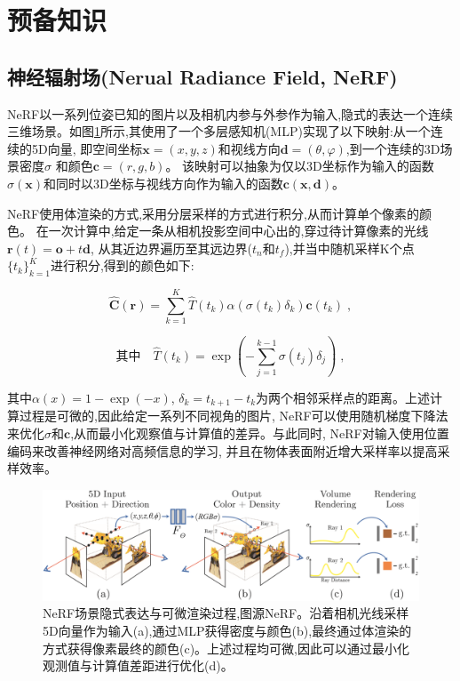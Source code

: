 \section{预备知识}\label{preliminaries}

\subsection{神经辐射场(Nerual\; Radiance\; Field, NeRF)}

NeRF以一系列位姿已知的图片以及相机内参与外参作为输入,隐式的表达一个连续三维场景。如图\ref{nerf}所示,其使用了一个多层感知机(MLP)实现了以下映射:从一个连续的5D向量,
即空间坐标$\mathbf{x}=(x,y,z)$和视线方向$\mathbf{d}=( \theta,\varphi )$,到一个连续的3D场景密度$\sigma$ 和颜色$\mathbf{c}=(r,g,b)$。
该映射可以抽象为仅以3D坐标作为输入的函数$\sigma (\mathbf{x})$和同时以3D坐标与视线方向作为输入的函数$\mathbf{c(x,d)}$。

NeRF使用体渲染的方式,采用分层采样的方式进行积分,从而计算单个像素的颜色。
在一次计算中,给定一条从相机投影空间中心出的,穿过待计算像素的光线$\mathbf{r}(t)=\mathbf{o}+t\mathbf{d}$,
从其近边界遍历至其远边界($t_n$和$t_f$),并当中随机采样K个点$\{t_k\}_{k=1}^K$进行积分,得到的颜色如下:

\begin{equation}
    \hat{\mathbf{C}}(\mathbf{r})=\sum_{k=1}^{K}\hat{T}(t_k)\alpha(\sigma(t_k)\delta_k)\mathbf{c}(t_k)\;,
\end{equation}

\begin{equation}
     \mbox{其中} \quad \hat{T}(t_k)=\exp{\left (-\sum_{j = 1}^{k-1}\sigma(t_j)\delta_j\right )}\;,
\end{equation}

其中$\alpha(x)=1-\exp{(-x)}$, $\delta_k=t_{k+1}-t_k$为两个相邻采样点的距离。上述计算过程是可微的,因此给定一系列不同视角的图片, NeRF可以使用随机梯度下降法来优化$\sigma$和$\mathbf{c}$,从而最小化观察值与计算值的差异。与此同时, NeRF对输入使用位置编码来改善神经网络对高频信息的学习, 并且在物体表面附近增大采样率以提高采样效率。

\begin{figure}[htbp]
    \includegraphics[scale = 1.2]{figures/nerf.png}
    \centering
    \caption{NeRF场景隐式表达与可微渲染过程,图源NeRF\cite{nerf}。沿着相机光线采样5D向量作为输入(a),通过MLP获得密度与颜色(b),最终通过体渲染的方式获得像素最终的颜色(c)。上述过程均可微,因此可以通过最小化观测值与计算值差距进行优化(d)。} \label{nerf}
\end{figure}
